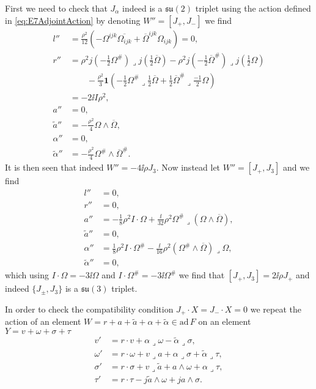First we need to check that $J_\alpha$ indeed is a $\mathfrak{su}(2)$ triplet using the action defined in \eqref{eq:E7AdjointAction} by denoting $W''=[J_+,J_-]$ we find 
\begin{equation}
    \begin{aligned}
        l''&= \frac{\rho^2}{12}(-\Omega^{ijk}\overbar{\Omega_{ijk}}+\overbar{\Omega}^{ijk}\Omega_{ijk}) = 0,\\
        r''&= \rho^2j(-\frac{1}{2}\Omega^{\#})\lrcorner j(\frac{1}{2}\overbar{\Omega})-\rho^2j(-\frac{1}{2}\overbar{\Omega}^{\#})\lrcorner j(\frac{1}{2}\Omega)\\
        &\qquad -\frac{\rho^2}{3}\mathbf{1}(-\frac{1}{2}\Omega^{\#}\lrcorner\frac{1}{2}\overbar{\Omega}+\frac{1}{2}\overbar{\Omega}^{\#}\lrcorner\frac{-1}{2}\Omega)\\
        &= -2\ii I\rho^2,\\
        a''&=0,\\
        \tilde{a}'' &= -\frac{\rho^2}{4}\Omega\wedge\overbar{\Omega},\\
        \alpha'' &= 0,\\
        \tilde{\alpha}'' &= -\frac{\rho^2}{4}\Omega^{\#}\wedge\overbar{\Omega}^{\#}.
    \end{aligned}
\end{equation}
It is then seen that indeed $W''=-4\ii\rho J_3$. Now instead let $W''=[J_+,J_3]$ and we find 
\begin{equation}
    \begin{aligned}
        l'' &= 0,\\
        r'' &= 0,\\
        a'' &= -\frac{1}{8}\rho^2 I\cdot \Omega+\frac{\ii}{32}\rho^2\Omega^{\#}\lrcorner (\Omega\wedge\overbar{\Omega}),\\
        \tilde{a}'' &= 0,\\
        \alpha '' &= \frac{1}{8}\rho^2 I\cdot \Omega^{\#}-\frac{\ii}{16}\rho^2(\Omega^{\#}\wedge\overbar{\Omega})\lrcorner\Omega,\\
        \tilde{\alpha}'' &= 0,
    \end{aligned}
\end{equation}
which using $I\cdot \Omega=-3\ii\Omega$ and $I\cdot \Omega^{\#}=-3\ii\Omega^{\#}$ we find that $[J_+,J_3]=2\ii\rho J_+$ and indeed $\{J_\pm,J_3\}$ is a $\mathfrak{su}(3)$ triplet. 

In order to check the compatibility condition $J_+\cdot X=J_-\cdot X=0$ we repeat the action of an element $W=r+a+\tilde{a}+\alpha+\tilde{\alpha}\in\text{ad}\,F$ on an element $Y=v+\omega+\sigma+\tau$
\begin{equation}\label{eq:E7action}
    \begin{aligned}
        v'&= r\cdot v+\alpha\lrcorner\omega-\tilde{\alpha}\lrcorner\sigma,\\
        \omega'&=r\cdot \omega+v\lrcorner a+\alpha\lrcorner\sigma+\tilde{\alpha}\lrcorner\tau,\\
        \sigma'&= r\cdot \sigma+v\lrcorner\tilde{a}+a\wedge\omega+\alpha\lrcorner\tau,\\
        \tau'&= r\cdot\tau-j\tilde{a}\wedge\omega+ja\wedge\sigma.
    \end{aligned}
\end{equation}

